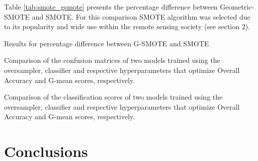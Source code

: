 \documentclass[parskip=full]{scrartcl}
\begin{document}
Table \ref{tab:smote_gsmote} presents the percentage difference  between
Geometric-SMOTE and SMOTE. For this comparison SMOTE algorithm was selected due
to its popularity and wide use within the remote sensing society (see section
2).

\begin{table}[H]
	\centering
	\caption{\label{tab:smote_gsmote}Results for percentage difference between
		G-SMOTE and SMOTE}
\end{table}

\begin{table}[H]
	\centering
	\caption{\label{tab:smote_gsmote}Comparison of the confusion matrices of two
	models trained using the oversampler, classifier and respective
	hyperparameters that optimize Overall Accuracy and G-mean scores,
	respectively.}
\end{table}

\begin{table}[H]
	\centering
	\caption{\label{tab:smote_gsmote}Comparison of the classification scores of
	two models trained using the oversampler, classifier and respective
	hyperparameters that optimize Overall Accuracy and G-mean scores,
	respectively.}
\end{table}

\section{Conclusions}





\end{document}
